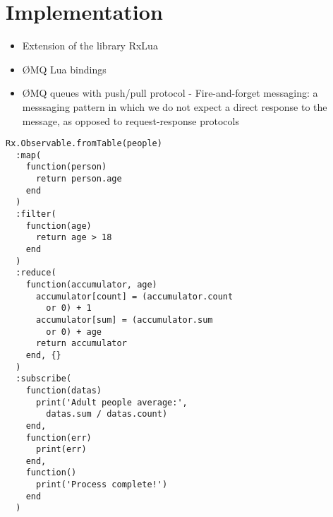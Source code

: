 \section{Implementation}
\label{sec:implementation}

\begin{itemize}
  \item Extension of the library RxLua
  \item ØMQ Lua bindings
  \item ØMQ queues with push/pull protocol - Fire-and-forget messaging: a messsaging pattern in which we do not expect a direct response to the message, as opposed to request-response protocols
\end{itemize}


\lstset{style = Luastyle}

\begin{minipage}{\linewidth}
\begin{lstlisting}[caption={Process pipeline example, using the library RxLua},label=pipeline-example]
Rx.Observable.fromTable(people)
  :map(
    function(person)
      return person.age
    end
  )
  :filter(
    function(age)
      return age > 18
    end
  )
  :reduce(
    function(accumulator, age)
      accumulator[count] = (accumulator.count
        or 0) + 1
      accumulator[sum] = (accumulator.sum
        or 0) + age
      return accumulator
    end, {}
  )
  :subscribe(
    function(datas)
      print('Adult people average:',
        datas.sum / datas.count)
    end,
    function(err)
      print(err)
    end,
    function()
      print('Process complete!')
    end
  )
\end{lstlisting}
\end{minipage}
